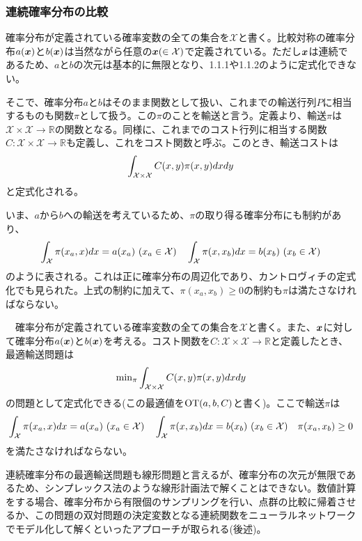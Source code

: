 \documentclass[dvipdfmx, 9pt, a4paper]{jsarticle}
\newcommand{\bm}[1]{{\mbox{\boldmath $#1$}}}
\begin{document}
\subsubsection{連続確率分布の比較}
確率分布が定義されている確率変数の全ての集合を$\mathcal{X}$と書く。比較対称の確率分布$a(\bm x)$と$b(\bm x)$は当然ながら任意の$\bm x(\in \mathcal{X})$で定義されている。ただし$\bm x$は連続であるため、$a$と$b$の次元は基本的に無限となり、1.1.1や1.1.2のように定式化できない。\par
そこで、確率分布$a$と$b$はそのまま関数として扱い、これまでの輸送行列$P$に相当するものも関数$\pi$として扱う。この$\pi$のことを輸送と言う。定義より、輸送$\pi$は$\mathcal{X}\times \mathcal{X} \to \mathbb{R}$の関数となる。同様に、これまでのコスト行列に相当する関数$C:\mathcal{X}\times \mathcal{X} \to \mathbb{R}$も定義し、これをコスト関数と呼ぶ。このとき、輸送コストは
\begin{equation}
\int_{\mathcal{X}\times \mathcal{X}}C(x, y)\pi(x, y)dxdy \notag
\end{equation}
と定式化される。\par
いま、$a$から$b$への輸送を考えているため、$\pi$の取り得る確率分布にも制約があり、
\begin{equation}
\int_{\mathcal{X}}\pi(x_a, x)dx=a(x_a)~(x_a \in \mathcal{X})~~~\int_{\mathcal{X}}\pi(x, x_b)dx=b(x_b)~(x_b \in \mathcal{X}) \notag
\end{equation}
のように表される。これは正に確率分布の周辺化であり、カントロヴィチの定式化でも見られた。上式の制約に加えて、$\pi(x_a, x_b) \geq 0$の制約も$\pi$は満たさなければならない。
\begin{tcolorbox}[title=確率分布の最適輸送問題]
　確率分布が定義されている確率変数の全ての集合を$\mathcal{X}$と書く。また、$\bm x$に対して確率分布$a(\bm x)$と$b(\bm x)$を考える。コスト関数を$C: \mathcal{X}\times \mathcal{X} \to \mathbb{R}$と定義したとき、最適輸送問題は
\begin{equation}
{\rm min}_{\pi}\int_{\mathcal{X}\times \mathcal{X}}C(x, y)\pi(x, y)dxdy
\end{equation}
の問題として定式化できる(この最適値を${\rm OT}(a, b, C)$と書く)。ここで輸送$\pi$は
\begin{equation}
\int_{\mathcal{X}}\pi(x_a, x)dx=a(x_a)~(x_a \in \mathcal{X})~~~\int_{\mathcal{X}}\pi(x, x_b)dx=b(x_b)~(x_b \in \mathcal{X})~~~\pi(x_a, x_b) \geq 0 \notag
\end{equation}
を満たさなければならない。
\end{tcolorbox}\par
連続確率分布の最適輸送問題も線形問題と言えるが、確率分布の次元が無限であるため、シンプレックス法のような線形計画法で解くことはできない。数値計算をする場合、確率分布から有限個のサンプリングを行い、点群の比較に帰着させるか、この問題の双対問題の決定変数となる連続関数をニューラルネットワークでモデル化して解くといったアプローチが取られる(後述)。
\end{document}
